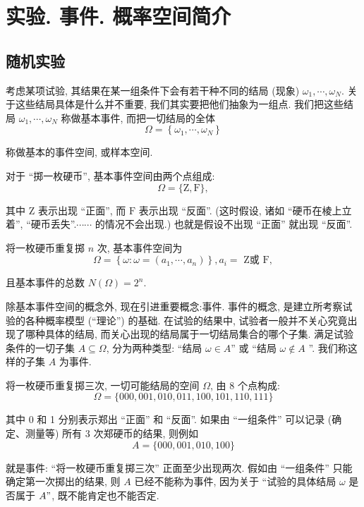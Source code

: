 \section{实验. 事件. 概率空间简介}
\subsection{随机实验}

考虑某项试验, 其结果在某一组条件下会有若干种不同的结局 (现象) $\omega_1, \cdots, \omega_N.$ 关于这些结局具体是什么并不重要, 我们其实要把他们抽象为一组点. 我们把这些结局 $\omega_1, \cdots, \omega_N$ 称做基本事件, 而把一切结局的全体
$$
\Omega=\left\{\omega_1, \cdots, \omega_N\right\}
$$

称做基本的事件空间, 或样本空间.

\begin{example}
    对于 ``掷一枚硬币'', 基本事件空间由两个点组成:
$$
\Omega=\{\mathrm{Z}, \mathrm{F}\},
$$

其中 Z 表示出现 ``正面'', 而 $\mathrm{F}$ 表示出现 ``反面''. (这时假设, 诸如 ``硬币在棱上立着'', ``硬币丢失''.$\cdots \cdots$ 的情况不会出现.) 也就是假设不出现 ``正面'' 就出现 ``反面''.

    将一枚硬币重复掷 $n$ 次, 基本事件空间为
$$
\Omega=\left\{\omega: \omega=\left(a_1, \cdots, a_n\right)\right\}, a_i=\text { Z或 } \mathrm{F},
$$

且基本事件的总数 $N(\Omega)=2^n$.
\end{example}

除基本事件空间的概念外, 现在引进重要概念:事件. 事件的概念, 是建立所考察试验的各种概率模型 (``理论'') 的基础. 在试验的结果中, 试验者一般并不关心究竟出现了哪种具体的结局, 而关心出现的结局属于一切结局集合的哪个子集. 满足试验条件的一切子集 $A \subseteq \Omega$, 分为两种类型: ``结局 $\omega \in A$'' 或 ``结局 $\omega \notin A$ ''. 我们称这样的子集 $A$ 为事件.

\begin{example}
    将一枚硬币重复掷三次, 一切可能结局的空间 $\Omega$, 由 8 个点构成:
$$
\Omega=\{000,001,010,011,100,101,110,111\}
$$

其中 0 和 1 分别表示郑出 ``正面'' 和 ``反面''. 如果由 ``一组条件'' 可以记录 (确定、测量等) 所有 3 次郑硬币的结果, 则例如
$$
A=\{000,001,010,100\}
$$

就是事件: ``将一枚硬币重复掷三次'' 正面至少出现两次. 假如由 ``一组条件'' 只能确定第一次掷出的结果, 则 $A$ 已经不能称为事件, 因为关于 ``试验的具体结局 $\omega$ 是否属于 $A "$, 既不能肯定也不能否定.
\end{example}

